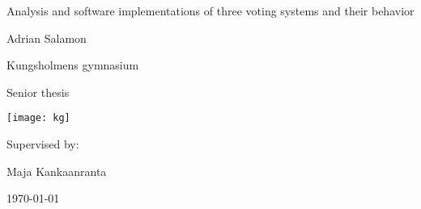 \begin{titlepage}
	\centering
	\vspace{2cm}
	{\Huge Analysis and software implementations of three voting systems and their behavior\par}
	\vspace{0.6cm}
	{\LARGE Adrian Salamon\par}
	\vspace{0.6cm}
	{\Large Kungsholmens gymnasium\par}
	\vspace{0.4cm}
	{\large Senior thesis\par}
	\vspace{0.6cm}
	\texttt{[image: kg]}\par\vspace{1cm}
	\vspace{4cm}
	\vfill
	Supervised by: \par
	Maja Kankaanranta

	\vfill

	{\large \today\par}
\end{titlepage}
